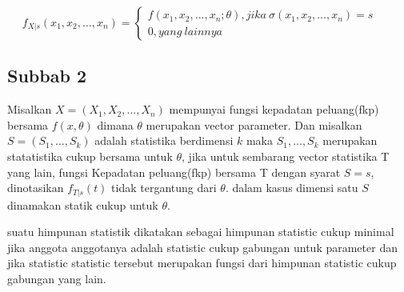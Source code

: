 \documentclass[a4paper,12pt]{article}
\theoremstyle{definition}
\begin{document}
\begin{equation*}
    f_{X|s}(x_1,x_2,...,x_n)=\left\{\begin{matrix}
f(x_1,x_2,...,x_n;\theta), jika \ \sigma (x_1,x_2,...,x_n)=s &  & \\ 
0, yang \ lainnya&  & 
\end{matrix}\right.
\end{equation*}


\subsection{Subbab 2}
Misalkan $X=(X_1,X_2,...,X_n)$ mempunyai fungsi kepadatan peluang(fkp) bersama $f(x,\theta)$ dimana $\theta$ merupakan vector parameter. Dan misalkan $S=(S_1,...,S_k)$ adalah statistika berdimensi $k$ maka $S_1,...,S_k$ merupakan statatistika cukup bersama untuk $\theta$, jika untuk sembarang vector statistika T yang lain, fungsi Kepadatan peluang(fkp) bersama T dengan syarat $S=s$, dinotasikan $f_{T|s}(t)$ tidak tergantung dari $\theta$. dalam kasus dimensi satu $S$ dinamakan statik cukup untuk $\theta$. 

suatu himpunan statistik dikatakan sebagai himpunan statistic cukup minimal jika anggota anggotanya adalah statistic cukup gabungan untuk parameter dan jika statistic statistic tersebut merupakan fungsi dari himpunan statistic cukup gabungan yang lain. 
\end{document}
